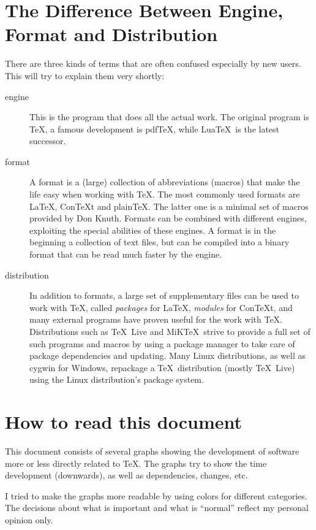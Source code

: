 \setlength{\columnsep}{1.5cm}
\newpage
\tableofcontents

\restoregeometry

\section{The Difference Between Engine, Format and Distribution}
There are three kinds of terms that are often confused especially by new users. This will try to explain them very shortly:
\begin{description}
\item[engine] This is the program that does all the actual work. The original program is \TeX, a famous development is pdf\TeX, while Lua\TeX\ is the latest successor.
\item[format] A format is a (large) collection of abbreviations (macros) that make the life easy when working with \TeX. The most commonly used formats are \LaTeX, Con\TeX t and plain\TeX. The latter one is a minimal set of macros provided by Don Knuth. Formats can be combined with different engines, exploiting the special abilities of these engines. A format is in the beginning a collection of text files, but can be compiled into a binary format that can be read much faster by the engine.
\item[distribution] In addition to formats, a large set of supplementary files can be used to work with \TeX, called \emph{packages} for \LaTeX, \emph{modules} for Con\TeX t, and many external programs have proven useful for the work with \TeX. Distributions such as \TeX~Live and MiK\TeX\ strive to provide a full set of such programs and macros by using a package manager to take care of package dependencies and updating. Many Linux distributions, as well as cygwin for Windows, repackage a \TeX\ distribution (mostly \TeX~Live) using the Linux distribution's package system.
\end{description}

\newpage
\section{How to read this document}
This document consists of several graphs showing the development of software more or less directly related to \TeX. The graphs try to show the time  development (downwards), as well as dependencies, changes, etc.

I tried to make the graphs more readable by using colors for different categories. The decisions about what is important and what is “normal” reflect my personal opinion only.

